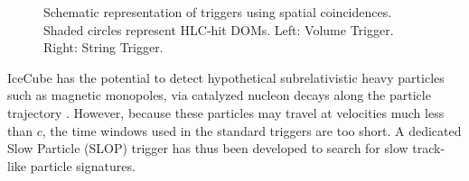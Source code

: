 \begin{figure}[ht]
  \centering {}
  \quad
  \caption{Schematic representation of triggers using spatial coincidences.  Shaded circles
    represent HLC-hit DOMs.  Left: Volume Trigger.  Right: String Trigger. }
\end{figure}

IceCube has the potential to detect hypothetical subrelativistic heavy
particles such as magnetic monopoles, via catalyzed nucleon decays along
the particle trajectory \cite{IC3:monopole}.  However, because these
particles may travel at velocities much less than $c$, the time
windows used in the standard triggers are too short.  A dedicated Slow
Particle (SLOP) trigger has thus been developed to search for slow
track-like particle signatures.

